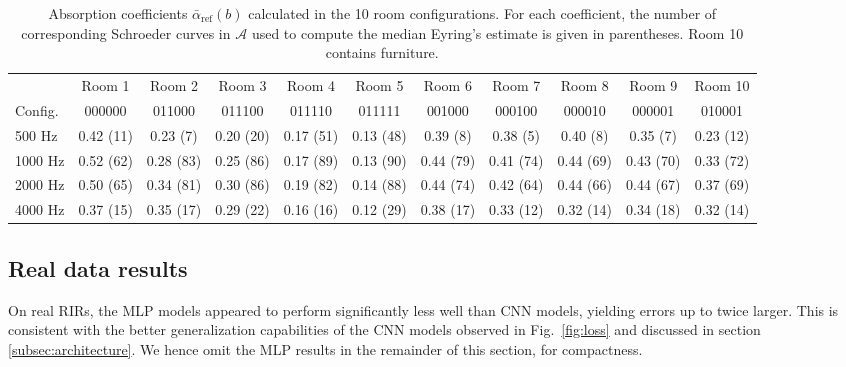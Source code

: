 \documentclass[reprint]{JASA}
\begin{document}
\begin{table*}[t!]
	\begin{center}
		\vspace{-5mm}
		\caption{\label{tab:rooms} Absorption coefficients $\bar{\alpha}_{\textrm{ref}}(b)$ calculated in the 10 room configurations. For each coefficient, the number of corresponding Schroeder curves in $\mathcal{A}$ used to compute the median Eyring's estimate is given in parentheses. Room 10 contains furniture.}
		\begin{ruledtabular}
			\footnotesize
			\begin{tabular}{l|cccccccccc}
				& Room 1 & Room 2 & Room 3 & Room 4 & Room 5 & Room 6 & Room 7 & Room 8 & Room 9 & Room 10 \\
				Config. & 000000 & 011000 & 011100 & 011110 & 011111 & 001000 & 000100 & 000010 & 000001 & 010001\\
				500 Hz  & 0.42 (11) & 0.23 (7) & 0.20 (20) & 0.17 (51) & 0.13 (48) & 0.39 (8) &	0.38 (5) &	0.40 (8) & 0.35 (7) & 0.23 (12) \\
				1000 Hz & 0.52 (62) & 0.28 (83) & 0.25 (86) & 0.17 (89) & 0.13 (90) & 0.44 (79) & 0.41 (74) & 0.44 (69) & 0.43 (70) & 0.33 (72) \\
				2000 Hz & 0.50 (65) & 0.34 (81) & 0.30 (86) & 0.19 (82) & 0.14 (88) & 0.44 (74) & 0.42 (64) &	0.44 (66) & 0.44 (67) & 0.37 (69) \\
				4000 Hz & 0.37 (15) & 0.35 (17) & 0.29 (22) & 0.16 (16) & 0.12 (29) & 0.38 (17) & 0.33 (12) & 0.32 (14) & 0.34 (18) & 0.32 (14) 
			\end{tabular}
		\end{ruledtabular}
	\end{center}
\end{table*}


\subsection{Real data results}
On real RIRs, the MLP models appeared to perform significantly less well than CNN models, yielding errors up to twice larger. This is consistent with the better generalization capabilities of the CNN models observed in Fig.~\ref{fig:loss} and discussed in section \ref{subsec:architecture}. We hence omit the MLP results in the remainder of this section, for compactness.
\end{document}
